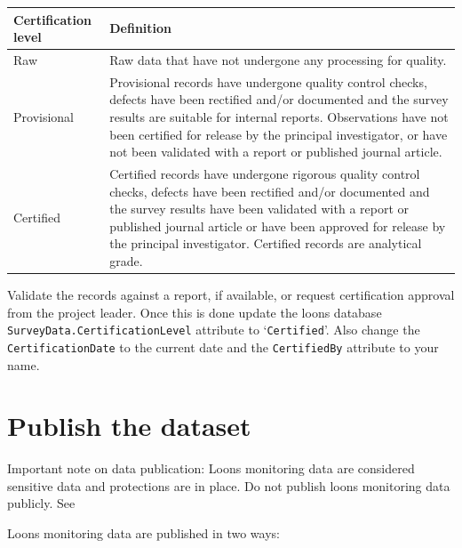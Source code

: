 \documentclass[
  letterpaper,
  DIV=11,
  numbers=noendperiod]{scrreprt}
\begin{document}
\begin{longtable}[]{@{}
  >{\raggedright\arraybackslash}p{}
  >{\raggedright\arraybackslash}p{}@{}}
\toprule\noalign{}
\begin{minipage}[b]{\linewidth}\raggedright
Certification level
\end{minipage} & \begin{minipage}[b]{\linewidth}\raggedright
Definition
\end{minipage} \\
\midrule\noalign{}
\endhead
\bottomrule\noalign{}
\endlastfoot
Raw & Raw data that have not undergone any processing for quality. \\
Provisional & Provisional records have undergone quality control checks,
defects have been rectified and/or documented and the survey results are
suitable for internal reports. Observations have not been certified for
release by the principal investigator, or have not been validated with a
report or published journal article. \\
Certified & Certified records have undergone rigorous quality control
checks, defects have been rectified and/or documented and the survey
results have been validated with a report or published journal article
or have been approved for release by the principal investigator.
Certified records are analytical grade. \\
\end{longtable}

Validate the records against a report, if available, or request
certification approval from the project leader. Once this is done update
the loons database \texttt{SurveyData.CertificationLevel} attribute to
`\texttt{Certified}'. Also change the \texttt{CertificationDate} to the
current date and the \texttt{CertifiedBy} attribute to your name.

\section{Publish the dataset}\label{publish-the-dataset}

Important note on data publication: Loons monitoring data are considered
sensitive data and protections are in place. Do not publish loons
monitoring data publicly. See

Loons monitoring data are published in two ways:
\end{document}
